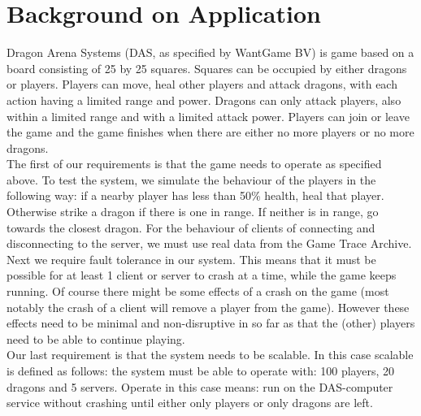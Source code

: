 \section{Background on Application}
\label{chap:background}
Dragon Arena Systems (DAS, as specified by WantGame BV) is game based on a board consisting of 25 by 25 squares. Squares can be occupied by either dragons or players. Players can move, heal other players and attack dragons, with each action having a limited range and power. Dragons can only attack players, also within a limited range and with a limited attack power. Players can join or leave the game and the game finishes when there are either no more players or no more dragons.\\
The first of our requirements is that the game needs to operate as specified above. To test the system, we simulate the behaviour of the players in the following way: if a nearby player has less than 50\% health, heal that player. Otherwise strike a dragon if there is one in range. If neither is in range, go towards the closest dragon. For the behaviour of clients of connecting and disconnecting to the server, we must use real data from the Game Trace Archive.\\
Next we require fault tolerance in our system. This means that it must be possible for at least 1 client or server to crash at a time, while the game keeps running. Of course there might be some effects of a crash on the game (most notably the crash of a client will remove a player from the game). However these effects need to be minimal and non-disruptive in so far as that the (other) players need to be able to continue playing.\\
Our last requirement is that the system needs to be scalable. In this case scalable is defined as follows: the system must be able to operate with: 100 players, 20 dragons and 5 servers. Operate in this case means: run on the DAS-computer service without crashing until either only players or only dragons are left.
